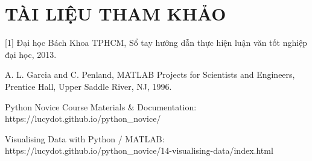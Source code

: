\section{TÀI LIỆU THAM KHẢO}
[1] Đại học Bách Khoa TPHCM, Sổ tay hướng dẫn thực hiện luận văn tốt nghiệp đại học, 2013.\par
[2] A. L. Garcia and C. Penland, MATLAB Projects for Scientists and Engineers, Prentice Hall, Upper Saddle River, NJ, 1996.\par
[3] Python Novice Course Materials \& Documentation: https://lucydot.github.io/python\_novice/\par
[4] Visualising Data with Python / MATLAB: https://lucydot.github.io/python\_novice/14-visualising-data/index.html\par